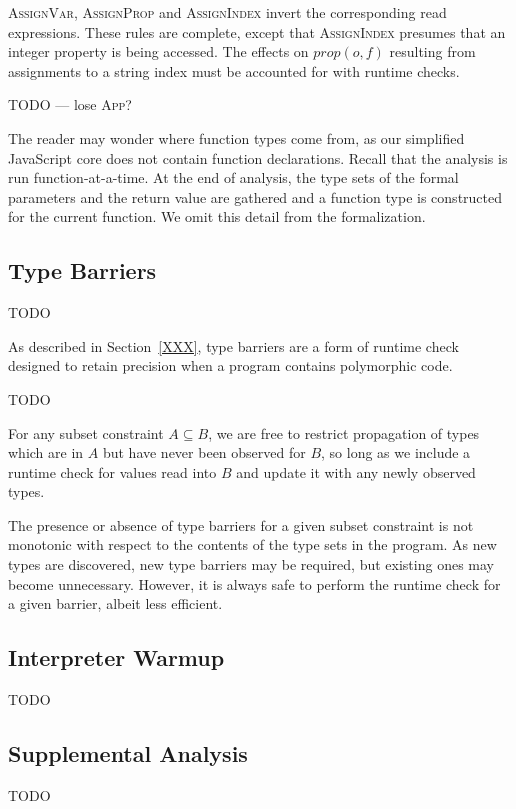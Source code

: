 \textsc{AssignVar}, \textsc{AssignProp} and \textsc{AssignIndex} invert
the corresponding read expressions.
These rules are complete, except that \textsc{AssignIndex} presumes that
an integer property is being accessed.
The effects on $prop(o,f)$ resulting from assignments to a string
index  must be accounted for with runtime checks.

TODO --- lose \textsc{App}?

The reader may wonder where function types come from, as our simplified
JavaScript core does not contain function declarations. Recall that the
analysis is run function-at-a-time. At the end of analysis, the type sets of
the formal parameters and the return value are gathered and a function type is
constructed for the current function. We omit this detail from the
formalization.

\subsection{Type Barriers}

TODO

As described in Section~\ref{XXX}, type barriers are a form of runtime
check designed to retain precision when a program contains polymorphic code.

TODO

For any subset constraint $A \subseteq B$, we are free to restrict
propagation of types which are in $A$ but have never been observed for $B$,
so long as we include a runtime check for values read into $B$ and update
it with any newly observed types.

The presence or absence of type barriers for a given subset constraint
is not monotonic with respect to the contents of the type sets in the program.
As new types are discovered, new type barriers may be required, but existing
ones may become unnecessary.
However, it is always safe to perform the runtime check for a given barrier,
albeit less efficient.

\subsection{Interpreter Warmup}

TODO

\subsection{Supplemental Analysis}

TODO

